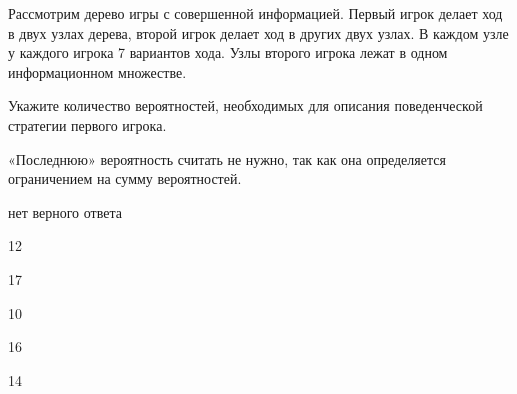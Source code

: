 
\begin{question}
Рассмотрим дерево игры с совершенной информацией. Первый игрок делает
ход в двух узлах дерева, второй игрок делает ход в других двух узлах. В
каждом узле у каждого игрока 7 вариантов хода. Узлы второго игрока лежат
в одном информационном множестве.

Укажите количество вероятностей, необходимых для описания поведенческой
стратегии первого игрока.

«Последнюю» вероятность считать не нужно, так как она определяется
ограничением на сумму вероятностей.
\begin{answerlist}
  \item нет верного ответа
  \item 12
  \item 17
  \item 10
  \item 16
  \item 14
\end{answerlist}
\end{question}


